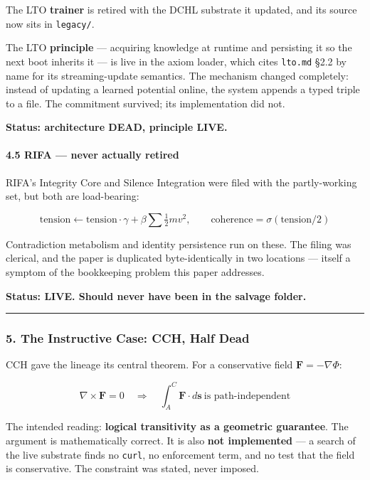 \documentclass[
  11pt,
  a4paper,
]{article}
\begin{document}
The LTO \textbf{trainer} is retired with the DCHL substrate it updated,
and its source now sits in \texttt{legacy/}.

The LTO \textbf{principle} --- acquiring knowledge at runtime and
persisting it so the next boot inherits it --- is live in the axiom
loader, which cites \texttt{lto.md} §2.2 by name for its
streaming-update semantics. The mechanism changed completely: instead of
updating a learned potential online, the system appends a typed triple
to a file. The commitment survived; its implementation did not.

\textbf{Status: architecture DEAD, principle LIVE.}

\paragraph{4.5 RIFA --- never actually
retired}\label{rifa-never-actually-retired}

RIFA's Integrity Core and Silence Integration were filed with the
partly-working set, but both are load-bearing:

\[
\text{tension} \leftarrow \text{tension}\cdot\gamma + \beta \textstyle\sum \tfrac12 m v^2,
\qquad
\text{coherence} = \sigma(\text{tension}/2)
\]

Contradiction metabolism and identity persistence run on these. The
filing was clerical, and the paper is duplicated byte-identically in two
locations --- itself a symptom of the bookkeeping problem this paper
addresses.

\textbf{Status: LIVE. Should never have been in the salvage folder.}

\begin{center}\rule{0.5\linewidth}{0.5pt}\end{center}

\subsubsection{5. The Instructive Case: CCH, Half
Dead}\label{the-instructive-case-cch-half-dead}

CCH gave the lineage its central theorem. For a conservative field
\(\mathbf{F} = -\nabla\Phi\):

\[
\nabla \times \mathbf{F} = 0
\quad\Longrightarrow\quad
\int_A^C \mathbf{F}\cdot d\mathbf{s} \ \text{is path-independent}
\]

The intended reading: \textbf{logical transitivity as a geometric
guarantee}. The argument is mathematically correct. It is also
\textbf{not implemented} --- a search of the live substrate finds no
\texttt{curl}, no enforcement term, and no test that the field is
conservative. The constraint was stated, never imposed.
\end{document}
